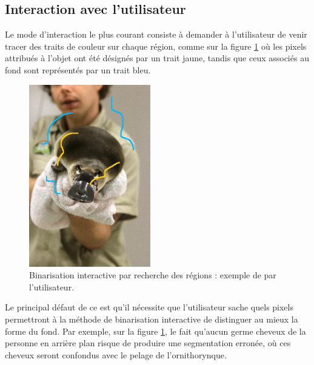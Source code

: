 \subsection{Interaction avec l'utilisateur}
Le mode d'interaction le plus courant consiste à demander à l'utilisateur de venir tracer des traits de couleur sur chaque région, comme sur la figure \ref{fig:sota_region_based_ihm} où les pixels attribués à l'objet ont été désignés par un trait jaune, tandis que ceux associés au fond sont représentés par un trait bleu. 

\begin{figure}[htb]
	\centering
			\includegraphics[height=0.35\textheight]{images/etat-de-l-art/region-based-method}
		 \caption{Binarisation interactive par recherche des régions : exemple de  par l'utilisateur.}
		 \label{fig:sota_region_based_ihm}
\end{figure}



Le principal défaut de ce  est qu'il nécessite que l'utilisateur sache quels pixels permettront à la méthode de binarisation interactive de distinguer au mieux la forme du fond. Par exemple, sur la figure \ref{fig:sota_region_based_ihm}, le fait qu'aucun germe  cheveux de la personne en arrière plan risque de produire une segmentation erronée, où ces cheveux seront confondus avec le pelage de l'ornithorynque.

